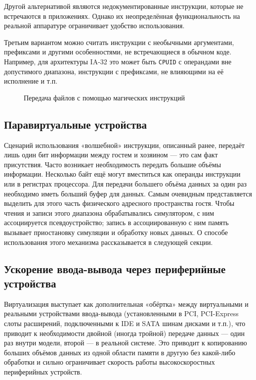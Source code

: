 Другой альтернативой являются недокументированные инструкции, которые не встречаются в приложениях. Однако их неопределённая функциональность на реальной аппаратуре ограничивает удобство использования.

Третьим вариантом можно считать инструкции с необычными аргументами, префиксами и другими особенностями, не встречающиеся в обычном коде. Например, для архитектуры IA-32 это может быть \texttt{CPUID} с операндами вне допустимого диапазона, инструкции с префиксами, не влияющими на её исполнение и т.п.

\begin{figure}[htp]
    \centering
    \caption{Передача файлов с помощью магических инструкций}
    \label{fig:magic-inst}
\end{figure}

\subsection{Паравиртуальные устройства}

Сценарий использования «волшебной» инструкции, описанный ранее, передаёт лишь один бит информации между гостем и хозяином — это сам факт присутствия. Часто возникает необходимость передать большие объёмы информации. Несколько байт ещё могут вместиться как операнды инструкции или в регистрах процессора. Для передачи большего объёма данных за один раз необходимо иметь больший буфер для данных. Самым очевидным представляется выделить для этого часть физического адресного пространства гостя. Чтобы чтения и записи этого диапазона обрабатывались симулятором, с ним ассоциируется псевдоустройство; запись в ассоциированную с ним память вызывает приостановку симуляции и обработку новых данных. О способе использования этого механизма рассказывается в следующей секции.

\subsection[Ускорение ввода-вывода]{Ускорение ввода-вывода через периферийные устройства}

Виртуализация выступает как дополнительная «обёртка» между виртуальными и реальными устройствами ввода-вывода (установленными в PCI, PCI-Express слоты расширений, подключенными к IDE и SATA шинам дисками и т.п.), что приводит к необходимости двойной (иногда тройной) передаче данных — один раз внутри модели, второй — в реальной системе. Это приводит к копированию больших объёмов данных из одной области памяти в другую без какой-либо обработки и сильно ограничивает скорость работы высокоскоростных периферийных устройств.

